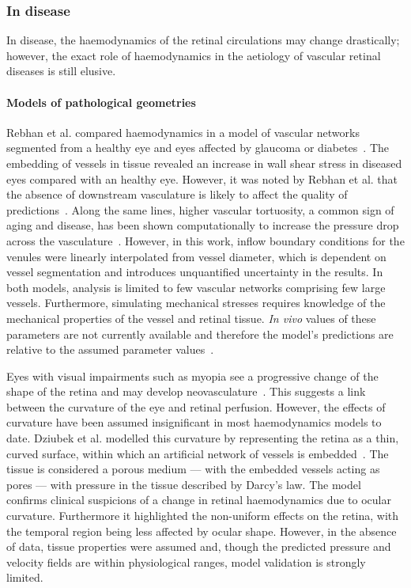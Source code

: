 \documentclass{article}
\begin{document}
\subsubsection{In disease} \label{sec:InDisease}

In disease, the haemodynamics of the retinal circulations may change drastically; however, the exact role of haemodynamics in the aetiology of vascular retinal diseases is still elusive.

\paragraph*{Models of pathological geometries} 

Rebhan et al. compared haemodynamics in a model of vascular networks segmented from a healthy eye and eyes affected by glaucoma or diabetes~\cite{Rebhan_2019}.
The embedding of vessels in tissue revealed an increase in wall shear stress in diseased eyes compared with an healthy eye.
However, it was noted by Rebhan et al. that the absence of downstream vasculature is likely to affect the quality of predictions~\cite{Rebhan_2019}.
Along the same lines, higher vascular tortuosity, a common sign of aging and disease, has been shown computationally to increase the pressure drop across the vasculature~\cite{Malek_2014}.
However, in this work, inflow boundary conditions for the venules were linearly interpolated from vessel diameter, which is dependent on vessel segmentation and introduces unquantified uncertainty in the results.
In both models, analysis is limited to few vascular networks comprising few large vessels.
Furthermore, simulating mechanical stresses requires knowledge of the mechanical properties of the vessel and retinal tissue.
\textit{In vivo} values of these parameters are not currently available and therefore the model's predictions are relative to the assumed parameter values~\cite{Rebhan_2019}.

Eyes with visual impairments such as myopia see a progressive change of the shape of the retina and may develop neovasculature~\cite{Medina_2016}.
This suggests a link between the curvature of the eye and retinal perfusion.
However, the effects of curvature have been assumed insignificant in most haemodynamics models to date.
Dziubek et al. modelled this curvature by representing the retina as a thin, curved surface, within which an artificial network of vessels is embedded~\cite{Dziubek_2015}.
The tissue is considered a porous medium --- with the embedded vessels acting as pores --- with pressure in the tissue described by Darcy's law.
The model confirms clinical suspicions of a change in retinal haemodynamics due to ocular curvature.
Furthermore it highlighted the non-uniform effects on the retina, with the temporal region being less affected by ocular shape\cite{Dziubek_2015}.
However, in the absence of data, tissue properties were assumed and, though the predicted pressure and velocity fields are within physiological ranges, model validation is strongly limited.
\end{document}
